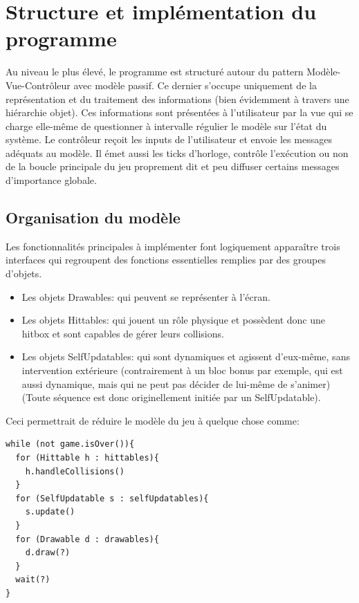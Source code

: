 \documentclass[a4paper, 12pt]{article}
\begin{document}
\section{Structure et implémentation du programme}

Au niveau le plus élevé, le programme est structuré autour du pattern Modèle-Vue-Contrôleur avec modèle passif. Ce dernier s'occupe uniquement de la représentation et du traitement des informations (bien évidemment à travers une hiérarchie objet). Ces informations sont présentées à l'utilisateur par la vue qui se charge elle-même de questionner à intervalle régulier le modèle sur l'état du système. Le contrôleur reçoit les inputs de l'utilisateur et envoie les messages adéquats au modèle. Il émet aussi les ticks d'horloge, contrôle l'exécution ou non de la boucle principale du jeu proprement dit et peu diffuser certains messages d'importance globale.

\subsection{Organisation du modèle}

Les fonctionnalités principales à implémenter font logiquement apparaître trois interfaces qui regroupent des fonctions essentielles remplies par des groupes d'objets.
\begin{itemize}
  \item Les objets Drawables: qui peuvent se représenter à l'écran.
  \item Les objets Hittables: qui jouent un rôle physique et possèdent donc une hitbox et sont capables de gérer leurs collisions.
  \item Les objets SelfUpdatables: qui sont dynamiques et agissent d'eux-même, sans intervention extérieure (contrairement à un bloc bonus par exemple, qui est aussi dynamique, mais qui ne peut pas décider de lui-même de s'animer)(Toute séquence est donc originellement initiée par un SelfUpdatable).
\end{itemize}

Ceci permettrait de réduire le modèle du jeu à quelque chose comme:

\begin{lstlisting}
while (not game.isOver()){
  for (Hittable h : hittables){
    h.handleCollisions()
  }
  for (SelfUpdatable s : selfUpdatables){
    s.update()
  }
  for (Drawable d : drawables){
    d.draw(?)
  }
  wait(?)
}
\end{lstlisting}
\end{document}

